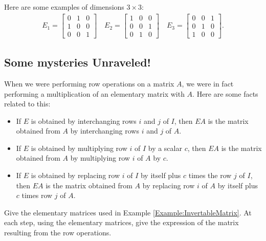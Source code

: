 \documentclass[12pt,a4paper]{article}
\newcounter{example}[section]
\begin{document}
	\begin{example}
	Here are some examples of dimensions $3 \times 3$:
		\begin{align*}
		E_1 = \begin{bmatrix}
		0 & 1 & 0\\ 1 & 0 & 0 \\ 0 & 0 & 1
		\end{bmatrix}
		\quad
		E_2 = \begin{bmatrix}
		1 & 0 & 0 \\ 0 & 0 & 1 \\ 0 & 1 & 0
		\end{bmatrix}
		\quad
		E_3 = \begin{bmatrix}
		0 & 0 & 1 \\ 0 & 1 & 0 \\ 1 & 0 & 0
		\end{bmatrix} .
		\end{align*}
	\end{example}
	
\newpage

\subsection{Some mysteries Unraveled!}
When we were performing row operations on a matrix $A$, we were in fact performing a multiplication of an elementary matrix with $A$. Here are some facts related to this:
	\begin{itemize}
		\item If $E$ is obtained by interchanging rows $i$ and $j$ of $I$, then $EA$ is the matrix obtained from $A$ by interchanging rows $i$ and $j$ of $A$.
		\item If $E$ is obtained by multiplying row $i$ of $I$ by a scalar $c$, then $EA$ is the matrix obtained from $A$ by multiplying row $i$ of $A$ by $c$.
		\item If $E$ is obtained by replacing row $i$ of $I$ by itself plus $c$ times the row $j$ of $I$, then $EA$ is the matrix obtained from $A$ by replacing row $i$ of $A$ by itself plus $c$ times row $j$ of $A$.
	\end{itemize}
	
	\vspace*{12pt}
	
	\begin{example}
	Give the elementary matrices used in Example \ref{Example:InvertableMatrix}. At each step, using the elementary matrices, give the expression of the matrix resulting from the row operations.
	\end{example}
	
\end{document}
